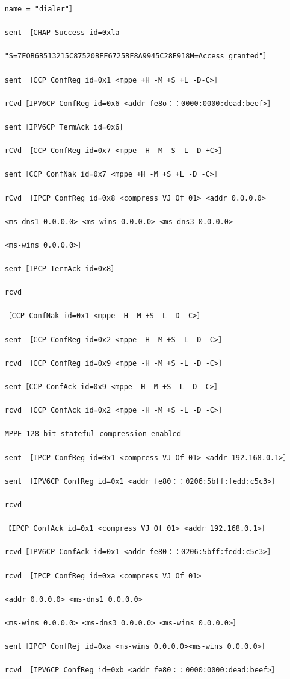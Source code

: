 \begin{verbatim}
    name = "dialer"］

    sent ［CHAP Success id=0xla

    "S=7EOB6B513215C87520BEF6725BF8A9945C28E918M=Access granted"］

    sent ［CCP ConfReg id=0x1 <mppe +H -M +S +L -D-C>］

    rCvd［IPV6CP ConfReg id=0x6 <addr fe8o：：0000:0000:dead:beef>］

    sent［IPV6CP TermAck id=0x6］

    rCVd ［CCP ConfReg id=0x7 <mppe -H -M -S -L -D +C>］

    sent［CCP ConfNak id=0x7 <mppe +H -M +S +L -D -C>］

    rCvd ［IPCP ConfReg id=0x8 <compress VJ Of 01> <addr 0.0.0.0>

    <ms-dns1 0.0.0.0> <ms-wins 0.0.0.0> <ms-dns3 0.0.0.0>

    <ms-wins 0.0.0.0>］

    sent［IPCP TermAck id=0x8］

    rcvd

    ［CCP ConfNak id=0x1 <mppe -H -M +S -L -D -C>］

    sent ［CCP ConfReg id=0x2 <mppe -H -M +S -L -D -C>］

    rcvd ［CCP ConfReg id=0x9 <mppe -H -M +S -L -D -C>］

    sent［CCP ConfAck id=0x9 <mppe -H -M +S -L -D -C>］

    rcvd ［CCP ConfAck id=0x2 <mppe -H -M +S -L -D -C>］

    MPPE 128-bit stateful compression enabled

    sent ［IPCP ConfReg id=0x1 <compress VJ Of 01> <addr 192.168.0.1>］

    sent ［IPV6CP ConfReg id=0x1 <addr fe80：：0206:5bff:fedd:c5c3>］

    rcvd

    【IPCP ConfAck id=0x1 <compress VJ Of 01> <addr 192.168.0.1>］

    rcvd［IPV6CP ConfAck id=0x1 <addr fe80：：0206:5bff:fedd:c5c3>］

    rcvd ［IPCP ConfReg id=0xa <compress VJ Of 01>

    <addr 0.0.0.0> <ms-dns1 0.0.0.0>

    <ms-wins 0.0.0.0> <ms-dns3 0.0.0.0> <ms-wins 0.0.0.0>］

    sent［IPCP ConfRej id=0xa <ms-wins 0.0.0.0><ms-wins 0.0.0.0>］

    rcvd ［IPV6CP ConfReg id=0xb <addr fe80：：0000:0000:dead:beef>］


\end{verbatim}
